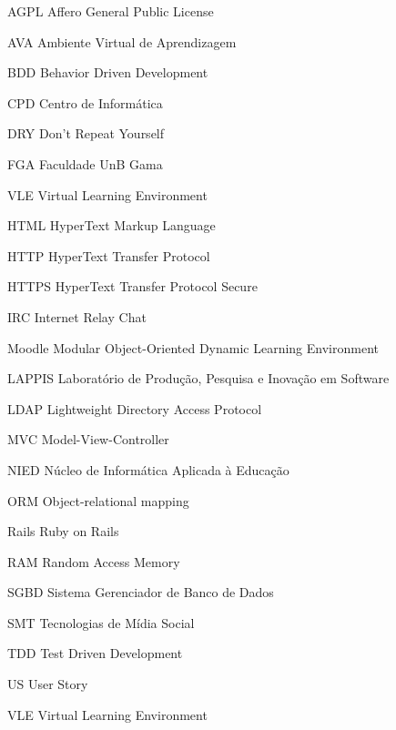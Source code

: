 \begin{siglas}
  \item[AGPL] Affero General Public License
  \item[AVA] Ambiente Virtual de Aprendizagem
  \item[BDD] Behavior Driven Development
  \item[CPD] Centro de Informática
  \item[DRY] Don’t Repeat Yourself
  \item[FGA] Faculdade UnB Gama
  \item[VLE] Virtual Learning Environment
  \item[HTML] HyperText Markup Language
  \item[HTTP] HyperText Transfer Protocol
  \item[HTTPS] HyperText Transfer Protocol Secure
  \item[IRC] Internet Relay Chat
  \item[Moodle] Modular Object-Oriented Dynamic Learning Environment
  \item[LAPPIS] Laboratório de Produção, Pesquisa e Inovação em Software
  \item[LDAP] Lightweight Directory Access Protocol
  \item[MVC] Model-View-Controller
  \item[NIED] Núcleo de Informática Aplicada à Educação
  \item[ORM] Object-relational mapping
  \item[Rails] Ruby on Rails
  \item[RAM] Random Access Memory
  \item[SGBD] Sistema Gerenciador de Banco de Dados
  \item[SMT] Tecnologias de Mídia Social
  \item[TDD] Test Driven Development
  \item[US] User Story
  \item[VLE] Virtual Learning Environment
\end{siglas}
